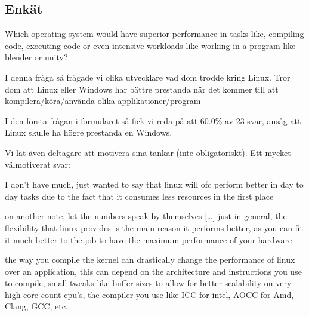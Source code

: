 \documentclass[12pt, a4paper]{report}
\begin{document}
    \subsection{Enkät}   \label{form}

\large {Which operating system would have superior performance in tasks like, compiling code, executing code or even intensive workloads like working in a program  like blender or unity?}
 
   \vspace{.5cm}
 
   \normalsize I denna fråga så frågade vi olika utvecklare vad dom trodde kring Linux. Tror dom att Linux eller Windows har bättre prestanda när det kommer till att kompilera/köra/använda olika applikationer/program
 
 
   \vspace{1cm}
 
 
   \cite{form}


   I den första frågan i formuläret så fick vi reda på att 60.0\% av 23 svar, ansåg att Linux skulle ha högre prestanda en Windows.

    \vspace{.5cm}
    Vi lät även deltagare att motivera sina tankar (inte obligatoriskt). Ett mycket välmotiverat svar: \begin{displayquote}I don't have much, just wanted to say that linux will ofc perform better in day to day tasks due to the fact that it consumes less resources in the first place

    on another note, let the numbers speak by themselves \hyperlink{https://www.phoronix.com/scan.php?page=article&item=win10-debian101-intel} [\dots] just in general, the flexibility that linux provides is the main reason it performs better, as you can fit it much better to the job to have the maximum performance of your hardware

    the way you compile the kernel can drastically change the performance of linux over an application, this can depend on the architecture and instructions you use to compile, small tweaks like buffer sizes to allow for better scalability on very high core count cpu's, the compiler you use like ICC for intel, AOCC for Amd, Clang, GCC, etc..\end{displayquote}
\end{document}

